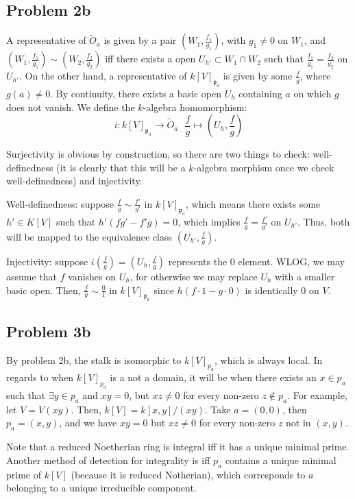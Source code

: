 \documentclass{article}
\theoremstyle{definition}
\theoremstyle{definition}
\theoremstyle{definition}
\theoremstyle{definition}
\theoremstyle{definition}
\theoremstyle{definition}
\theoremstyle{definition}
\begin{document}
\subsection*{Problem 2b}
A representative of $\tilde{O}_a$ is given by a pair $(W_1, \frac{f_1}{g_1})$, with $g_1\neq 0$ on $W_1$, and $(W_1, \frac{f_1}{g_1})\sim (W_2, \frac{f_2}{g_2})$ iff there exists a open $U_{h'}\subset W_1\cap W_2$ such that $\frac{f_1}{g_1}=\frac{f_2}{g_2}$ on $U_{h'}$. On the other hand, a representative of $k[V]_{\mathfrak{p}_a}$ is given by some $\frac{f}{g}$, where $g(a)\neq 0$. By continuity, there exists a basic open $U_h$ containing $a$ on which $g$ does not vanish. We define the $k$-algebra homomorphism: 
\[i: k[V]_{\mathfrak{p}_a}\to \tilde{O}_a  \ \ \ \frac{f}{g}\mapsto (U_h, \frac{f}{g})\]

Surjectivity is obvious by construction, so there are two things to check: well-definedness (it is clearly that this will be a $k$-algebra morphism once we check well-definedness) and injectivity.

Well-definedness: suppose $\frac{f}{g}\sim \frac{f'}{g'}$ in $k[V]_{\mathfrak{p}_a}$, which means there exists some $h'\in K[V]$ such that $h'(fg'-f'g)=0$, which implies $\frac{f}{g}=\frac{f'}{g'}$ on $U_{h'}$. Thus, both will be mapped to the equivalence class $(U_{h'},\frac{f}{g})$.

Injectivity: suppose $i(\frac{f}{g})=(U_h,\frac{f}{g})$ represents the $0$ element. WLOG, we may assume that $f$ vanishes on $U_h$, for otherwise we may replace $U_h$ with a smaller basic open. Then, $\frac{f}{g}\sim \frac{0}{1}$ in $ k[V]_{\mathfrak{p}_a}$ since $h(f\cdot 1-g\cdot 0)$ is identically $0$ on $V$.

\subsection*{Problem 3b}
By problem 2b, the stalk is isomorphic to $k[V]_{p_a}$, which is always local. In regards to when $k[V]_{p_a}$ is a not a domain, it will be when there exists an $x\in p_a$ such that $\exists y\in p_a$ and $xy=0$, but $xz\neq 0$ for every non-zero $z\not \in p_a$. For example, let $V=V(xy)$. Then, $k[V]=k[x,y]/(xy)$. Take $a=(0,0)$, then $p_a=(x,y)$, and we have $xy=0$ but $xz\neq 0$ for every non-zero $z$ not in $(x,y)$. 

Note that a reduced Noetherian ring is integral iff it has a unique minimal prime. Another method of detection for integrality is iff $p_a$ contains a unique minimal prime of $k[V]$ (because it is reduced Notherian), which corresponds to $a$ belonging to a unique irreducible component.
\end{document}
